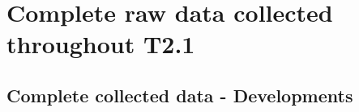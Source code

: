 \documentclass[
  12pt,
  oneside]{book}
\begin{document}






\chapter{Complete raw data collected throughout T2.1}\label{sec-A2}

\section{Complete collected data -
Developments}\label{complete-collected-data---developments}


\setlength{\tabcolsep}{2pt}
\renewcommand{\arraystretch}{0.75}
\end{document}

